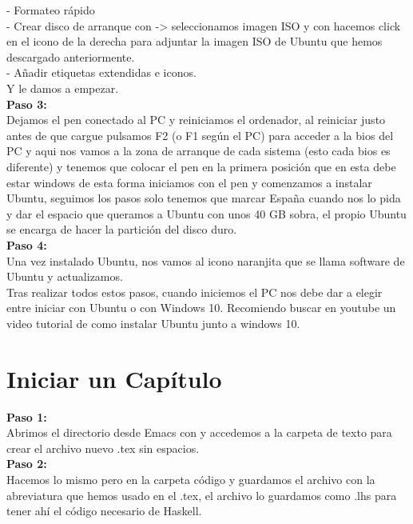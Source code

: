 - Formateo rápido\\

- Crear disco de arranque con -> seleccionamos imagen ISO y con hacemos click en el icono de la derecha para adjuntar la imagen ISO de Ubuntu que hemos descargado anteriormente.\\

- Añadir etiquetas extendidas e iconos.\\

Y le damos a empezar.\\


\textbf{Paso 3:}\\
Dejamos el pen conectado al PC y reiniciamos el ordenador, al reiniciar justo antes de que cargue pulsamos F2 (o F1 según el PC) para acceder a la bios del PC y aqui nos vamos a la zona de arranque de cada sistema (esto cada bios es diferente) y tenemos que colocar el pen en la primera posición que en esta debe estar windows de esta forma iniciamos con el pen y comenzamos a instalar Ubuntu, seguimos los pasos solo tenemos que marcar España cuando nos lo pida y dar el espacio que queramos a Ubuntu con unos 40 GB sobra, el propio Ubuntu se encarga de hacer la partición del disco duro.\\

\textbf{Paso 4:}\\
Una vez instalado Ubuntu, nos vamos al icono naranjita que se llama software de Ubuntu y actualizamos.\\

Tras realizar todos estos pasos, cuando iniciemos el PC nos debe dar a elegir entre iniciar con Ubuntu o con Windows 10. Recomiendo buscar en youtube un video tutorial de como instalar Ubuntu junto a windows 10.\\


\section{Iniciar un Capítulo}

\textbf{Paso 1:}\\
Abrimos el directorio desde Emacs con  y accedemos a la carpeta de texto para crear el archivo nuevo .tex sin espacios.\\

\textbf{Paso 2:}\\
Hacemos lo mismo pero en la carpeta código y guardamos el archivo con la abreviatura que hemos usado en el .tex, el archivo lo guardamos como .lhs para tener ahí el código necesario de Haskell. \\

